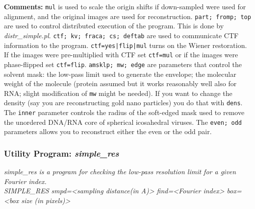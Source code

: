 \documentclass[review]{elsarticle}
\begin{document}
{\noindent\textbf{Comments:} \texttt{mul} is used to scale the origin shifts if down-sampled were used for alignment, and the original images are used for reconstruction. \texttt{part; fromp; top} are used to control distributed execution of the program. This is done by {\it{distr\_simple.pl}}. \texttt{ctf; kv; fraca; cs; deftab} are used to communicate CTF information to the program. \texttt{ctf=yes|flip|mul} turns on the Wiener restoration. If the images were pre-multiplied with CTF set \texttt{ctf=mul} or if the images were phase-flipped set \texttt{ctf=flip}. \texttt{amsklp; mw; edge} are parameters that control the solvent mask: the low-pass limit used to generate the envelope; the molecular weight of the molecule (protein assumed but it works reasonably well also for RNA; slight modification of \texttt{mw} might be needed). If you want to change the density (say you are reconstructing gold nano particles) you do that with \texttt{dens}. The \texttt{inner} parameter controls the radius of the soft-edged mask used to remove the unordered DNA/RNA core of spherical icosahedral viruses. The \texttt{even; odd} parameters allows you to reconstruct either the even or the odd pair.

\subsubsection{Utility Program: {\it{simple\_res}}}
\label{res}
{\it{simple\_res} is a program for checking the low-pass resolution limit for a given Fourier index.}\\
{\it{SIMPLE\_RES smpd=<sampling distance(in A)> find=<Fourier index> box=<box size}}
{\it{(in pixels)>}}

}
\end{document}
